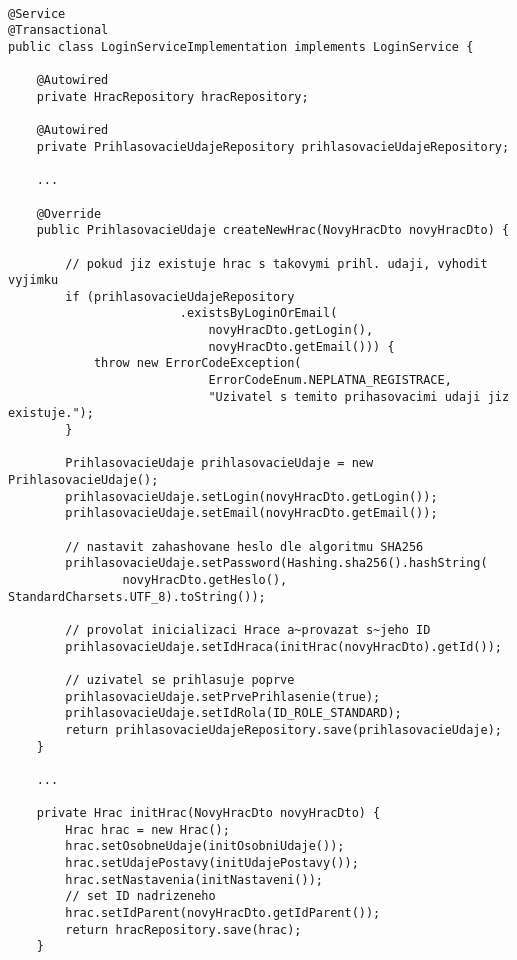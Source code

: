 \documentclass[twoside, 12pt]{article}
\begin{document}
{{

\begin{lstlisting}

@Service
@Transactional
public class LoginServiceImplementation implements LoginService {

    @Autowired
    private HracRepository hracRepository;

    @Autowired
    private PrihlasovacieUdajeRepository prihlasovacieUdajeRepository;

    ...

    @Override
    public PrihlasovacieUdaje createNewHrac(NovyHracDto novyHracDto) {

        // pokud jiz existuje hrac s takovymi prihl. udaji, vyhodit vyjimku
        if (prihlasovacieUdajeRepository
                        .existsByLoginOrEmail(
                            novyHracDto.getLogin(),
                            novyHracDto.getEmail())) {
            throw new ErrorCodeException(
                            ErrorCodeEnum.NEPLATNA_REGISTRACE,
                            "Uzivatel s temito prihasovacimi udaji jiz existuje.");
        }

        PrihlasovacieUdaje prihlasovacieUdaje = new PrihlasovacieUdaje();
        prihlasovacieUdaje.setLogin(novyHracDto.getLogin());
        prihlasovacieUdaje.setEmail(novyHracDto.getEmail());

        // nastavit zahashovane heslo dle algoritmu SHA256
        prihlasovacieUdaje.setPassword(Hashing.sha256().hashString(
                novyHracDto.getHeslo(), StandardCharsets.UTF_8).toString());

        // provolat inicializaci Hrace a~provazat s~jeho ID
        prihlasovacieUdaje.setIdHraca(initHrac(novyHracDto).getId());

        // uzivatel se prihlasuje poprve
        prihlasovacieUdaje.setPrvePrihlasenie(true);
        prihlasovacieUdaje.setIdRola(ID_ROLE_STANDARD);
        return prihlasovacieUdajeRepository.save(prihlasovacieUdaje);
    }

    ...

    private Hrac initHrac(NovyHracDto novyHracDto) {
        Hrac hrac = new Hrac();
        hrac.setOsobneUdaje(initOsobniUdaje());
        hrac.setUdajePostavy(initUdajePostavy());
        hrac.setNastavenia(initNastaveni());
        // set ID nadrizeneho
        hrac.setIdParent(novyHracDto.getIdParent());
        return hracRepository.save(hrac);
    }
\end{lstlisting}

}}
\end{document}
